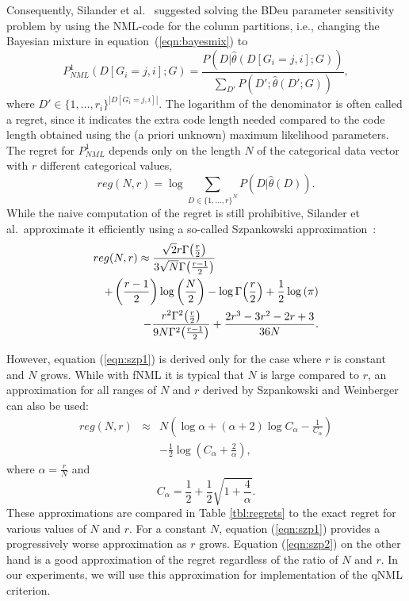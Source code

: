 Consequently, Silander et al.~\cite{cosco.pgm08a}
suggested solving the BDeu parameter sensitivity problem by using the
NML-code for the column partitions, i.e., changing the Bayesian mixture
in equation~(\ref{eqn:bayesmix}) to
\begin{equation}
P^1_{NML}(D[G_i=j,i];G)=\frac{P(D|\hat\theta(D[G_i=j,i];G))}{\sum_{D'}{P(D';\hat\theta(D';G))}},
\end{equation}
where $D'\in{\{1,\ldots,r_i\}}^{|D[G_i=j,i]|}$.  The logarithm of the
denominator is often called a regret, since it indicates the extra
code length needed compared to the code length obtained using the (a
priori unknown) maximum likelihood parameters. The regret for
$P^1_{NML}$ depends only on the length $N$ of the categorical data
vector with $r$ different categorical values,
\begin{equation}
reg(N,r)=\log \sum_{D\in \{1,\ldots,r\}^N} P(D|\hat\theta(D)).
\end{equation}
While the naive
computation of the regret is still prohibitive, Silander et al.\
approximate it efficiently using a so-called Szpankowski
approximation~\cite{cosco.aistat03}:
\begin{eqnarray}
\label{eqn:szp1}
\lefteqn{reg(N,r) \approx \frac{\sqrt{2} r \Gamma{\left(\frac{r}{2} \right)}}
                               {3 \sqrt{N} \Gamma{\left(\frac{r-1}{2}  \right)}}} \\
&&+ \left(\frac{r-1}{2}\right) \log{\left (\frac{N}{2} \right )}
- \log \Gamma{\left(\frac{r}{2} \right)} + \frac{1}{2} \log{\left (\pi \right )}\nonumber\\
&&- \frac{r^{2} \Gamma^{2}{\left(\frac{r }{2} \right)}}
         {9N \Gamma^{2}{\left(\frac{r-1}{2}\right)}}
+ \frac{2r^3-3r^2-2r+3}{36N}\nonumber.
\end{eqnarray}

However, equation (\ref{eqn:szp1}) is derived only for the case
where $r$ is constant and $N$ grows. While with
fNML it is typical that $N$ is large compared to $r$, an
approximation for all ranges of $N$ and $r$ derived by
Szpankowski and Weinberger~\cite{Szpankowski2012} can also be used:
\begin{eqnarray}
\label{eqn:szp2}
    reg(N, r) & \approx & N\left(\log{\alpha} + (\alpha + 2) \log{C_\alpha}
                - \frac{1}{C_\alpha}\right)\nonumber \\
    && - \frac{1}{2} \log{\left(C_\alpha + \frac{2}{\alpha}\right)},
\end{eqnarray}
where $\alpha = \frac{r}{N}$ and
\begin{equation}
    C_\alpha = \frac{1}{2} + \frac{1}{2} \sqrt{1 + \frac{4}{\alpha}}.
\end{equation}
These approximations are compared in Table \ref{tbl:regrets} to the
exact regret for various values of $N$ and $r$.  For a constant $N$,
equation (\ref{eqn:szp1}) provides a progressively worse approximation
as $r$ grows. Equation (\ref{eqn:szp2}) on the other hand is a good
approximation of the regret regardless of the ratio of $N$ and $r$.
In our experiments, we will use this approximation for 
implementation of the qNML criterion.


